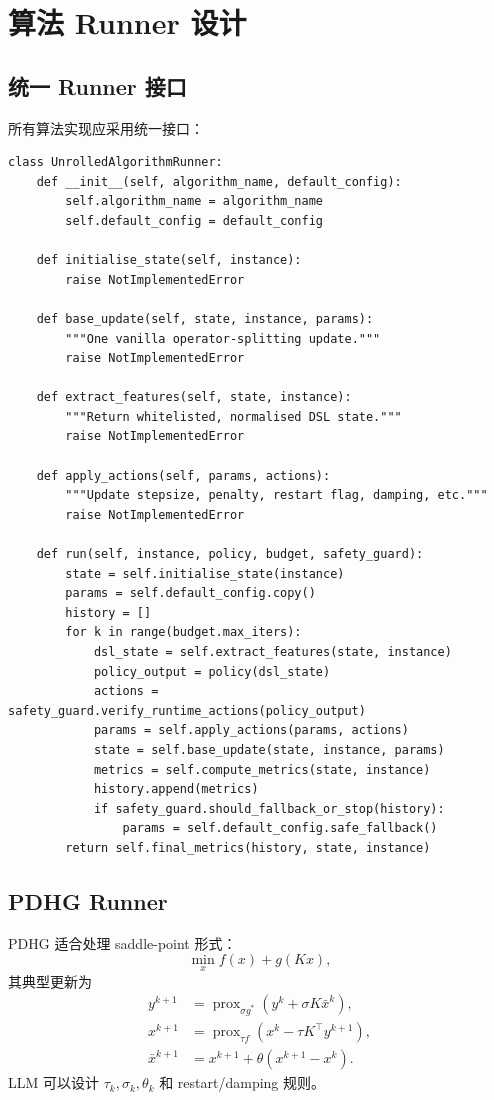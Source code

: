 \documentclass[12pt,a4paper]{ctexart}
\begin{document}
\section{算法 Runner 设计}

\subsection{统一 Runner 接口}
所有算法实现应采用统一接口：

\begin{lstlisting}[style=pythonstyle]
class UnrolledAlgorithmRunner:
    def __init__(self, algorithm_name, default_config):
        self.algorithm_name = algorithm_name
        self.default_config = default_config

    def initialise_state(self, instance):
        raise NotImplementedError

    def base_update(self, state, instance, params):
        """One vanilla operator-splitting update."""
        raise NotImplementedError

    def extract_features(self, state, instance):
        """Return whitelisted, normalised DSL state."""
        raise NotImplementedError

    def apply_actions(self, params, actions):
        """Update stepsize, penalty, restart flag, damping, etc."""
        raise NotImplementedError

    def run(self, instance, policy, budget, safety_guard):
        state = self.initialise_state(instance)
        params = self.default_config.copy()
        history = []
        for k in range(budget.max_iters):
            dsl_state = self.extract_features(state, instance)
            policy_output = policy(dsl_state)
            actions = safety_guard.verify_runtime_actions(policy_output)
            params = self.apply_actions(params, actions)
            state = self.base_update(state, instance, params)
            metrics = self.compute_metrics(state, instance)
            history.append(metrics)
            if safety_guard.should_fallback_or_stop(history):
                params = self.default_config.safe_fallback()
        return self.final_metrics(history, state, instance)
\end{lstlisting}

\subsection{PDHG Runner}
PDHG 适合处理 saddle-point 形式：
\begin{equation}
    \min_x f(x)+g(Kx),
\end{equation}
其典型更新为
\begin{align}
    y^{k+1} &= \operatorname{prox}_{\sigma g^*}\left(y^k + \sigma K \bar x^k\right),\\
    x^{k+1} &= \operatorname{prox}_{\tau f}\left(x^k - \tau K^\top y^{k+1}\right),\\
    \bar x^{k+1} &= x^{k+1}+\theta(x^{k+1}-x^k).
\end{align}
LLM 可以设计 $\tau_k,\sigma_k,\theta_k$ 和 restart/damping 规则。
\end{document}

